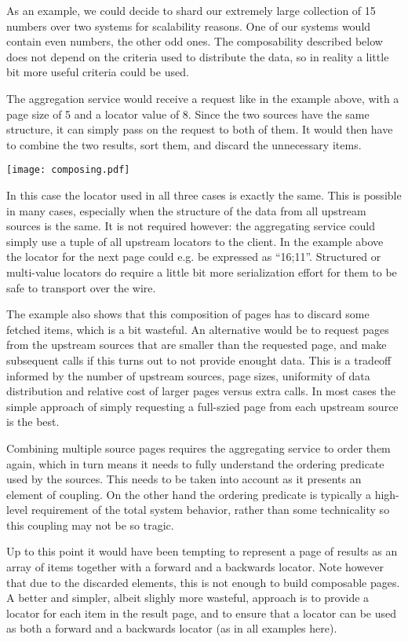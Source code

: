 \documentclass[11pt,a4paper]{article}
\begin{document}
\begin{multicols*}{2}
As an example, we could decide to shard our extremely large collection of 15
numbers over two systems for scalability reasons. One of our systems would
contain even numbers, the other odd ones. The composability described
below does not depend on the criteria used to distribute the data, so in reality
a little bit more useful criteria could be used.

The aggregation service would receive a request like in the example above, with
a page size of 5 and a locator value of 8. Since the two sources have the same
structure, it can simply pass on the request to both of them. It would then have
to combine the two results, sort them, and discard the unnecessary items. 

\texttt{[image: composing.pdf]}

In this case the locator used in all three cases is exactly the same. This is
possible in many cases, especially when the structure of the data from all
upstream sources is the same. It is not required however: the aggregating
service could simply use a tuple of all upstream locators to the client. In the
example above the locator for the next page could e.g. be expressed as
``16;11''. Structured or multi-value locators do require a little bit more
serialization effort for them to be safe to transport over the wire.

The example also shows that this composition of pages has to discard some
fetched items, which is a bit wasteful. An alternative would be to request
pages from the upstream sources that are smaller than the requested page, and
make subsequent calls if this turns out to not provide enought data. This is a
tradeoff informed by the number of upstream sources, page sizes, uniformity of
data distribution and relative cost of larger pages versus extra calls. In most
cases the simple approach of simply requesting a full-szied page from each
upstream source is the best.

Combining multiple source pages requires the aggregating service to order them
again, which in turn means it needs to fully understand the ordering predicate
used by the sources. This needs to be taken into account as it presents an
element of coupling. On the other hand the ordering predicate is typically a
high-level requirement of the total system behavior, rather than some
technicality so this coupling may not be so tragic.

Up to this point it would have been tempting to represent a page of results as
an array of items together with a forward and a backwards locator. Note however
that due to the discarded elements, this is not enough to build composable
pages. A better and simpler, albeit slighly more wasteful, approach is to
provide a locator for each item in the result page, and to ensure that a locator
can be used as both a forward and a backwards locator (as in all examples
here).


\end{multicols*}
\end{document}

